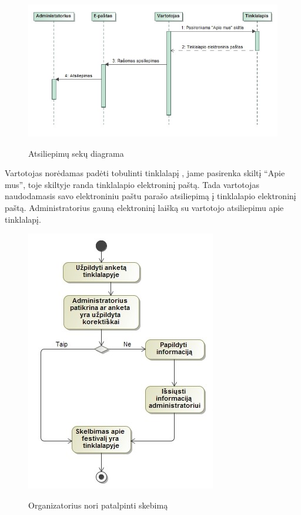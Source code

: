 \documentclass{VUMIFPSkursinis}
\begin{document}
\begin{figure}[H]
    \centering
    \includegraphics[scale=0.7]{img/geri/_klientasmintis}
    \label{img:uml10}
	\caption{Atsiliepimų sekų diagrama}
\end{figure}

Vartotojas norėdamas padėti tobulinti tinklalapį , jame pasirenka skiltį “Apie mus”, toje skiltyje randa tinklalapio elektroninį paštą. Tada vartotojas naudodamasis savo elektroniniu paštu parašo atsiliepimą į tinklalapio elektroninį paštą. Administratorius gauną elektroninį laišką su vartotojo atsiliepimu apie tinklalapį. 

\begin{figure}[H]
    \centering
    \includegraphics[scale=0.7]{img/geri/festivalOrg}
    \label{img:uml11}
	\caption{Organizatorius nori patalpinti skebimą}
\end{figure}
\end{document}
